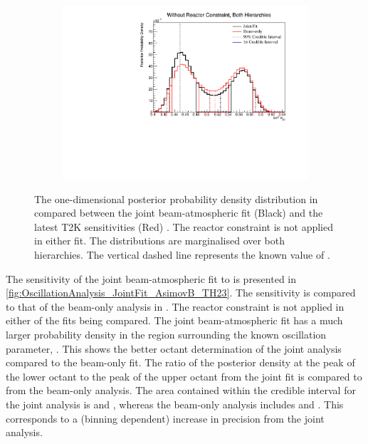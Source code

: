 \begin{figure}[h]
  \begin{subfigure}[t]{0.98\textwidth}
    \includegraphics[width=\textwidth, trim={0mm 0mm 0mm 0mm}, clip,page=1]{Figures/OA/JointFit_OA2020_Comp_AsimovB/ContourComparison_1D_th23_BH_2_woRC_UnSmeared_CredibleInterval.pdf}
  \end{subfigure}
  \caption{The one-dimensional posterior probability density distribution in  compared between the joint beam-atmospheric fit (Black) and the latest T2K sensitivities (Red) \cite{Dunne2020-uf, t2k_tn_393}. The reactor constraint is not applied in either fit. The distributions are marginalised over both hierarchies. The vertical dashed line represents the known value of .}
  \label{fig:OscillationAnalysis_JointFit_AsimovB_TH23}
\end{figure}

The sensitivity of the joint beam-atmospheric fit to  is presented in \autoref{fig:OscillationAnalysis_JointFit_AsimovB_TH23}. The sensitivity is compared to that of the beam-only analysis in \cite{Dunne2020-uf, t2k_tn_393}. The reactor constraint is not applied in either of the fits being compared. The joint beam-atmospheric fit has a much larger probability density in the region surrounding the known oscillation parameter, . This shows the better octant determination of the joint analysis compared to the beam-only fit. The ratio of the posterior density at the peak of the lower octant to the peak of the upper octant from the joint fit is  compared to  from the beam-only analysis. The area contained within the \quickmath{1\sigma} credible interval for the joint analysis is  and , whereas the beam-only analysis includes  and . This corresponds to a  (binning dependent) increase in precision from the joint analysis.

